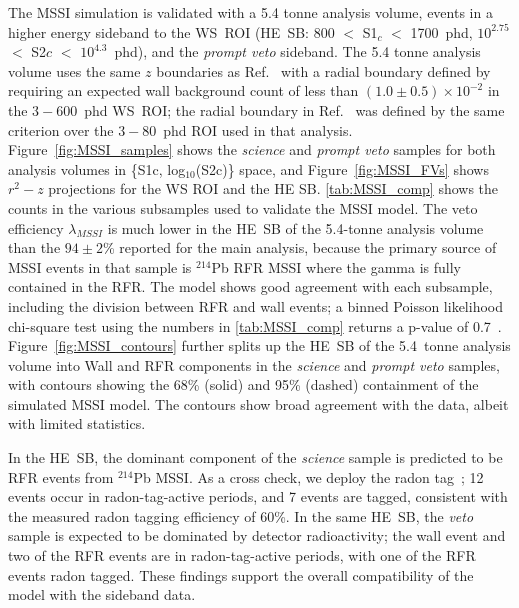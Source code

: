 The MSSI simulation is validated with a 5.4 tonne analysis volume, events in a higher energy sideband to the WS~ROI (HE~SB: 800 $<$ S1$_c$ $<$ 1700~phd, $10^{2.75}$ $<$ S2$c$ $<$ $10^{4.3}$~phd), and the \emph{prompt veto} sideband.  The 5.4 tonne analysis volume uses the same $z$ boundaries as Ref.~\cite{LZ:SR3_WS2024} with a radial boundary defined by requiring an expected wall background count of less than $(1.0 \pm 0.5)\times10^{-2}$ in the $3-600$~phd WS~ROI; the radial boundary in Ref.~\cite{LZ:SR3_WS2024} was defined by the same criterion over the $3-80$~phd ROI used in that analysis. 
Figure~\ref{fig:MSSI_samples} shows the \emph{science} and \emph{prompt veto} samples for both analysis volumes in \{S1c, log$_{10}$(S2c)\} space, and Figure~\ref{fig:MSSI_FVs} shows $r^2-z$ projections for the WS ROI and the HE SB. 
\autoref{tab:MSSI_comp} shows the counts in the various subsamples used to validate the MSSI model. The veto efficiency $\lambda_{MSSI}$ is much lower in the HE~SB of the 5.4-tonne analysis volume than the $94\pm2$\% reported for the main analysis, because the primary source of MSSI events in that sample is $^{214}$Pb RFR MSSI where the gamma is fully contained in the RFR.
The model shows good agreement with each subsample, including the division between RFR and wall events; a binned Poisson likelihood chi-square test using the numbers in \autoref{tab:MSSI_comp} returns a p-value of 0.7~\cite{BAKER1984437}.
Figure~\ref{fig:MSSI_contours} further splits up the HE~SB of the 5.4~tonne analysis volume into Wall and RFR components in the \emph{science} and \emph{prompt veto} samples, with contours showing the 68\% (solid) and 95\% (dashed) containment of the simulated MSSI model.
The contours show broad agreement with the data, albeit with limited statistics. 

In the HE~SB, the dominant component of the \emph{science} sample is predicted to be RFR events from $^{214}$Pb MSSI. 
As a cross check, we deploy the radon tag~\cite{LZ:2025xxf}; 12 events occur in radon-tag-active periods, and 7 events are tagged, consistent with the measured radon tagging efficiency of 60\%. 
In the same HE~SB, the \emph{veto} sample is expected to be dominated by detector radioactivity; the wall event and two of the RFR events are in radon-tag-active periods, with one of the RFR events radon tagged.  
These findings support the overall compatibility of the model with the sideband data.  

